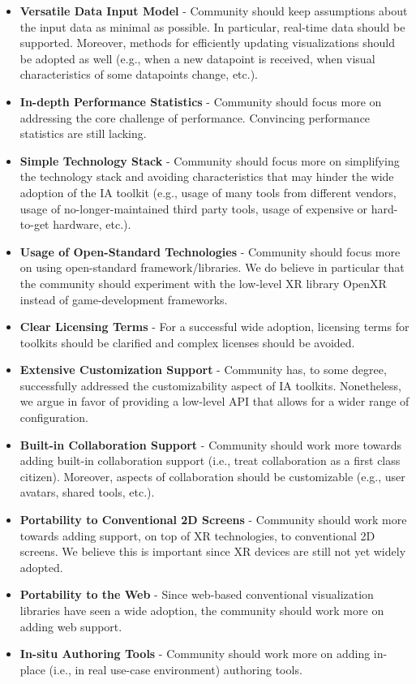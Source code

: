 \documentclass{vgtc}                          %
\begin{document}
\begin{itemize}
	\item \textbf{Versatile Data Input Model} - Community should keep
	      assumptions about the input data as minimal as possible. In
	      particular, real-time data should be supported. Moreover, methods for
	      efficiently updating visualizations should be adopted as well (e.g.,
	      when a new datapoint is received, when visual characteristics of some
	      datapoints change, etc.).
	\item \textbf{In-depth Performance Statistics} - Community should focus
	      more on addressing the core challenge of performance. Convincing
	      performance statistics are still lacking.
	\item \textbf{Simple Technology Stack} - Community should focus more on
	      simplifying the technology stack and avoiding characteristics that
	      may hinder the wide adoption of the IA toolkit (e.g., usage of many
	      tools from different vendors, usage of no-longer-maintained third
	      party tools, usage of expensive or hard-to-get hardware, etc.).
	\item \textbf{Usage of Open-Standard Technologies} - Community should focus more on
	      using open-standard framework/libraries. We do believe in particular
	      that the community should experiment with the low-level XR library
	      OpenXR instead of game-development frameworks.
	\item \textbf{Clear Licensing Terms} - For a successful wide adoption,
	      licensing terms for toolkits should be clarified and complex licenses
	      should be avoided.
	\item \textbf{Extensive Customization Support} - Community has, to some degree,
	      successfully addressed the customizability aspect of IA toolkits.
	      Nonetheless, we argue in favor of providing a low-level API that
	      allows for a wider range of configuration.
	\item \textbf{Built-in Collaboration Support} - Community should work more towards
	      adding built-in collaboration support (i.e., treat collaboration as a first
	      class citizen). Moreover, aspects of collaboration should be customizable (e.g., user avatars, shared tools, etc.).
	\item \textbf{Portability to Conventional 2D Screens} - Community should
	      work more towards adding support, on top of XR technologies, to
	      conventional 2D screens. We believe this is important since XR
	      devices are still not yet widely adopted.
	\item \textbf{Portability to the Web} - Since web-based conventional
	      visualization libraries have seen a wide adoption, the community
	      should work more on adding web support.
	\item \textbf{In-situ Authoring Tools} - Community should work more on
	      adding in-place (i.e., in real use-case environment) authoring tools.
\end{itemize}
\end{document}
